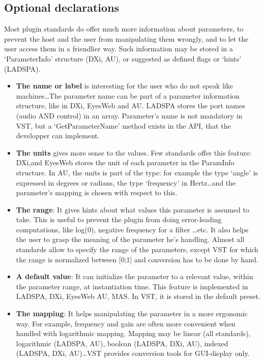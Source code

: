 \subsection{Optional declarations}
\noindent Most plugin standards do offer much more information about parameters, to prevent the host and the user from manipulating them wrongly, and to let the user access them in a friendlier way. Such information may be stored in a `ParameterInfo' structure (DXi, AU), or suggested as defined flags or `hints' (LADSPA).

\begin{itemize}
\item{\textbf{The name or label}} is interesting for the user who do not speak like machines\ldots The parameter name can be part of a parameter information structure, like in DXi, EyesWeb and AU. LADSPA stores the port names (audio AND control) in an array. Parameter's name is not mandatory in VST, but a `GetParameterName' method exists in the API, that the developper can implement.

\item{\textbf{The units}} gives more sense to the values. Few standards offer this feature: DXi,and EyesWeb stores the unit of each parameter in the ParamInfo structure. In AU, the units is part of the type: for example the type `angle' is expressed in degrees or radians, the type `frequency' in Hertz\ldots and the parameter's mapping is chosen with respect to this.

\item{\textbf{The range}}: It gives hints about what values this parameter is assumed to take. This is useful to prevent the plugin from doing error-leading computations, like log(0), negative frequency for a filter \ldots etc. It also helps the user to grasp the meaning of the parameter he's handling. Almost all standards allow to specify the range of the parameters, except VST for which the range is normalized between [0;1] and conversion has to be done by hand. 

\item{\textbf{A default value}}: It can initialize the parameter to a relevant value, within the parameter range, at instantiation time. This feature is implemented in LADSPA, DXi, EyesWeb AU, MAS. In VST, it is stored in the default preset.

\item{\textbf{The mapping}}: It helps manipulating the parameter in a more ergonomic way. For example, frequency and gain are often more convenient when handled with logarithmic mapping. Mapping may be linear (all standards), logarithmic (LADSPA, AU), boolean (LADSPA, DXi, AU), indexed (LADSPA, DXi, AU)\ldots VST provides conversion tools for GUI-display only.


\end{itemize}
